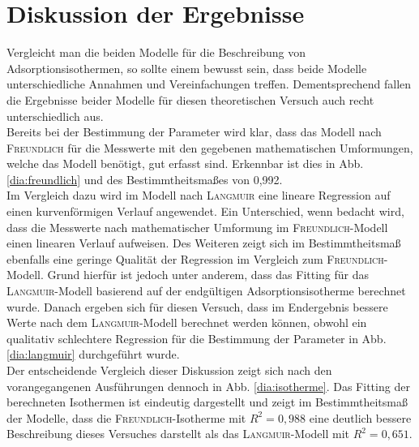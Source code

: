 \section{Diskussion der Ergebnisse}
\label{sec:diskussion}

Vergleicht man die beiden Modelle für die Beschreibung von Adsorptionsisothermen, so sollte einem bewusst sein, dass beide Modelle unterschiedliche Annahmen und Vereinfachungen treffen. Dementsprechend fallen die Ergebnisse beider Modelle für diesen theoretischen Versuch auch recht unterschiedlich aus. \\

Bereits bei der Bestimmung der Parameter wird klar, dass das Modell nach \textsc{Freundlich} für die Messwerte mit den gegebenen mathematischen Umformungen, welche das Modell benötigt,  gut erfasst sind. Erkennbar ist dies in Abb. \ref{dia:freundlich} und des Bestimmtheitsmaßes von 0,992.\\
Im Vergleich dazu wird im Modell nach \textsc{Langmuir} eine lineare Regression auf einen kurvenförmigen Verlauf angewendet. Ein Unterschied, wenn bedacht wird, dass die Messwerte nach mathematischer Umformung im \textsc{Freundlich}-Modell einen linearen Verlauf aufweisen. Des Weiteren zeigt sich im Bestimmtheitsmaß ebenfalls eine geringe Qualität der Regression im Vergleich zum \textsc{Freundlich}-Modell. Grund hierfür ist jedoch unter anderem, dass das Fitting für das \textsc{Langmuir}-Modell basierend auf der endgültigen Adsorptionsisotherme berechnet wurde. Danach ergeben sich für diesen Versuch, dass im Endergebnis bessere Werte nach dem \textsc{Langmuir}-Modell berechnet werden können, obwohl ein qualitativ schlechtere Regression für die Bestimmung der Parameter in Abb. \ref{dia:langmuir} durchgeführt wurde.\\

Der entscheidende Vergleich dieser Diskussion zeigt sich nach den vorangegangenen Ausführungen dennoch in Abb. \ref{dia:isotherme}. Das Fitting der berechneten Isothermen ist eindeutig dargestellt und zeigt im Bestimmtheitsmaß der Modelle, dass die \textsc{Freundlich}-Isotherme mit $R^2=0,988$ eine deutlich bessere Beschreibung dieses Versuches darstellt als das \textsc{Langmuir}-Modell mit $R^2=0,651$.